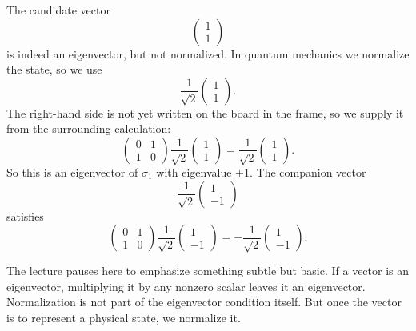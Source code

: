 The candidate vector
\begin{equation}
\begin{pmatrix}
1\\
1
\end{pmatrix}
\end{equation}
is indeed an eigenvector, but not normalized. In quantum mechanics we normalize the state, so we use
\begin{equation}
\frac{1}{\sqrt{2}}
\begin{pmatrix}
1\\
1
\end{pmatrix}.
\end{equation}
The right-hand side is not yet written on the board in the frame, so we supply it from the surrounding calculation:
\begin{equation}
\begin{pmatrix}
0&1\\
1&0
\end{pmatrix}
\frac{1}{\sqrt{2}}
\begin{pmatrix}
1\\
1
\end{pmatrix}
=
\frac{1}{\sqrt{2}}
\begin{pmatrix}
1\\
1
\end{pmatrix}.
\end{equation}
So this is an eigenvector of \(\sigma_1\) with eigenvalue \(+1\). The companion vector
\begin{equation}
\frac{1}{\sqrt{2}}
\begin{pmatrix}
1\\
-1
\end{pmatrix}
\end{equation}
satisfies
\begin{equation}
\begin{pmatrix}
0&1\\
1&0
\end{pmatrix}
\frac{1}{\sqrt{2}}
\begin{pmatrix}
1\\
-1
\end{pmatrix}
=
-
\frac{1}{\sqrt{2}}
\begin{pmatrix}
1\\
-1
\end{pmatrix}.
\end{equation}

The lecture pauses here to emphasize something subtle but basic. If a vector is an eigenvector, multiplying it by any nonzero scalar leaves it an eigenvector. Normalization is not part of the eigenvector condition itself. But once the vector is to represent a physical state, we normalize it.

